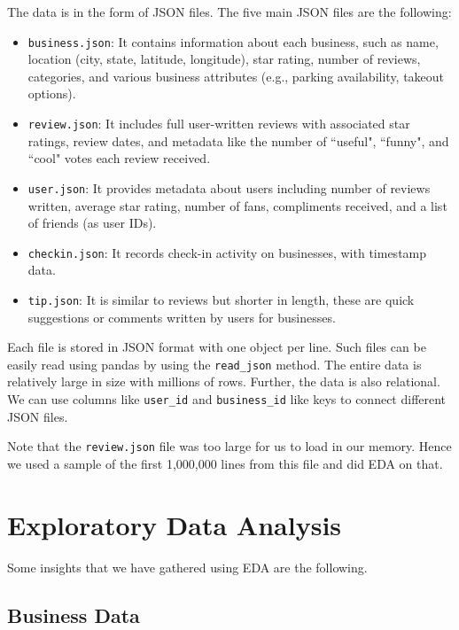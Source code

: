 \documentclass[conference]{IEEEtran}
\begin{document}
The data is in the form of JSON files. The five main JSON files are the following:
\begin{itemize}
    \item \texttt{business.json}: It contains information about each business,
    such as name, location (city, state, latitude, longitude), star rating,
    number of reviews, categories, and various business attributes (e.g.,
    parking availability, takeout options).
    \item \texttt{review.json}: It includes full user-written reviews with
    associated star ratings, review dates, and metadata like the number of ``useful",
    ``funny", and ``cool" votes each review received.
    \item \texttt{user.json}: It provides metadata about users including number
    of reviews written, average star rating, number of fans, compliments received,
    and a list of friends (as user IDs).
    \item \texttt{checkin.json}: It records check-in activity on businesses, with
    timestamp data.
    \item \texttt{tip.json}: It is similar to reviews but shorter in length,
    these are quick suggestions or comments written by users for businesses.
\end{itemize}

Each file is stored in JSON format with one object per line. Such files can be
easily read using pandas by using the \texttt{read\_json} method. The entire data
is relatively large in size with millions of rows. Further, the data is also
relational. We can use columns like \texttt{user\_id} and \texttt{business\_id}
like keys to connect different JSON files.

Note that the \texttt{review.json} file was too large for us to load in our memory.
Hence we used a sample of the first 1,000,000 lines from this file and did EDA
on that.

\section{Exploratory Data Analysis}

Some insights that we have gathered using EDA are the following.

\subsection{Business Data}
\end{document}
